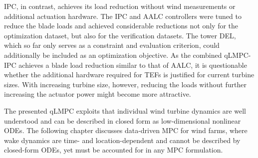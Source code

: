 IPC, in contrast, achieves its load reduction without wind measurements or additional actuation hardware. The IPC and AALC controllers were tuned to reduce the blade loads and achieved considerable reductions not only for the optimization dataset, but also for the verification datasets. The tower DEL, which so far only serves as a constraint and evaluation criterion, could additionally be included as an optimization objective. As the combined qLMPC-IPC achieves a blade load reduction similar to that of AALC, it is questionable whether the additional hardware required for TEFs is justified for current turbine sizes. With increasing turbine size, however, reducing the loads without further increasing the actuator power might become more attractive.

The presented qLMPC exploits that individual wind turbine dynamics are well understood and can be described in closed form as low-dimensional nonlinear ODEs. The following chapter discusses data-driven MPC for wind farms, where wake dynamics are time- and location-dependent and cannot be described by closed-form ODEs, yet must be accounted for in any MPC formulation.



